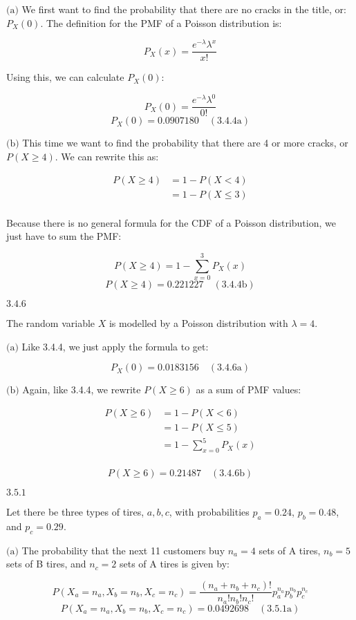 \documentclass{article}
\newcommand{\problem}[2]{$\boxed{\text{#1.#2}}$}
\newcommand{\subproblem}[3]{$\boxed{\text{(#3)}}$}
\newcommand{\subsolution}[4]{\boxed{#4\quad(\text{#1.#2#3})}}
\newcommand{\multistep}[1]{\begin{array}{rl} #1 \end{array}}
\begin{document}
%
\subproblem{3.4}{4}{a} We first want to find the probability that
there are no cracks in the title, or: $P_X(0)$. The definition for the
PMF of a Poisson distribution is:

\[
P_X(x)=\frac{e^{-\lambda}\lambda^x}{x!}
\]

Using this, we can calculate $P_X(0)$:

\[
P_X(0)=\frac{e^{-\lambda}\lambda^0}{0!}
\] \[
\subsolution{3.4}{4}{a}{P_X(0)=0.0907180}
\]

%
\subproblem{3.4}{4}{b} This time we want to find the probability that
there are 4 or more cracks, or $P(X\ge4)$. We can rewrite this as:

\[
\multistep{
P(X\ge4)&=1-P(X<4) \\
&=1-P(X\le3) \\
}
\]

Because there is no general formula for the CDF of a Poisson
distribution, we just have to sum the PMF:

\[
P(X\ge4)=1-\sum\limits_{x=0}^3 P_X(x)
\] \[
\subsolution{3.4}{4}{b}{P(X\ge4)=0.221227}
\]

%
\problem{3.4}{6}

The random variable $X$ is modelled by a Poisson distribution with
$\lambda=4$.

%
\subproblem{3.4}{6}{a} Like 3.4.4, we just apply the formula to get:

\[
\subsolution{3.4}{6}{a}{P_X(0)=0.0183156}
\]

%
\subproblem{3.4}{6}{b} Again, like 3.4.4, we rewrite $P(X\ge6)$ as a
sum of PMF values:

\[
\multistep{
P(X\ge6)&=1-P(X<6) \\
&=1-P(X\le5) \\
&=1-\sum\limits_{x=0}^5 P_X(x) \\
}
\]

\[
\subsolution{3.4}{6}{b}{P(X\ge6)=0.21487}
\]

%
\problem{3.5}{1}

Let there be three types of tires, $a,b,c$, with probabilities
$p_a=0.24$, $p_b=0.48$, and $p_c=0.29$.

%
\subproblem{3.5}{1}{a} The probability that the next 11 customers buy
$n_a=4$ sets of A tires, $n_b=5$ sets of B tires, and $n_c=2$ sets of
A tires is given by:

\[
P(X_a=n_a,X_b=n_b,X_c=n_c)=\frac{(n_a+n_b+n_c)!}{n_a!n_b!n_c!} p_a^{n_a} p_b^{n_b} p_c^{n_c}
\] \[
\subsolution{3.5}{1}{a}{P(X_a=n_a,X_b=n_b,X_c=n_c)=0.0492698}
\]
\end{document}
